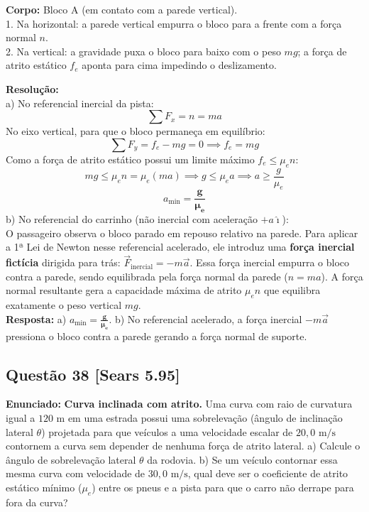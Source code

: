 \documentclass[11pt,a4paper]{article}
\begin{document}
\begin{dclbox}
\textbf{Corpo:} Bloco A (em contato com a parede vertical).\\
1. Na horizontal: a parede vertical empurra o bloco para a frente com a força normal $n$.\\
2. Na vertical: a gravidade puxa o bloco para baixo com o peso $mg$; a força de atrito estático $f_e$ aponta para cima impedindo o deslizamento.
\end{dclbox}

\noindent
\textbf{Resolução:}\\
a) No referencial inercial da pista:
\[ \sum F_x = n = m a \]
No eixo vertical, para que o bloco permaneça em equilíbrio:
\[ \sum F_y = f_e - mg = 0 \implies f_e = mg \]
Como a força de atrito estático possui um limite máximo $f_e \le \mu_e n$:
\[ mg \le \mu_e n = \mu_e (m a) \implies g \le \mu_e a \implies a \ge \frac{g}{\mu_e} \]
\[ a_{\text{min}} = \mathbf{\frac{g}{\mu_e}} \]
b) No referencial do carrinho (não inercial com aceleração $+a\hat{\imath}$):\\
O passageiro observa o bloco parado em repouso relativo na parede. Para aplicar a 1ª Lei de Newton nesse referencial acelerado, ele introduz uma \textbf{força inercial fictícia} dirigida para trás: $\vec{F}_{\text{inercial}} = -m\vec{a}$. Essa força inercial empurra o bloco contra a parede, sendo equilibrada pela força normal da parede ($n = ma$). A força normal resultante gera a capacidade máxima de atrito $\mu_e n$ que equilibra exatamente o peso vertical $mg$.\\
\textbf{Resposta:} a) $a_{\text{min}} = \mathbf{\frac{g}{\mu_e}}$. b) No referencial acelerado, a força inercial $-m\vec{a}$ pressiona o bloco contra a parede gerando a força normal de suporte.

\vspace{0.3cm}
\subsection*{Questão 38 [Sears 5.95]}
\textbf{Enunciado:} \textbf{Curva inclinada com atrito.} Uma curva com raio de curvatura igual a $120\text{ m}$ em uma estrada possui uma sobrelevação (ângulo de inclinação lateral $\theta$) projetada para que veículos a uma velocidade escalar de $20,0\text{ m/s}$ contornem a curva sem depender de nenhuma força de atrito lateral. a) Calcule o ângulo de sobrelevação lateral $\theta$ da rodovia. b) Se um veículo contornar essa mesma curva com velocidade de $30,0\text{ m/s}$, qual deve ser o coeficiente de atrito estático mínimo ($\mu_e$) entre os pneus e a pista para que o carro não derrape para fora da curva?
\end{document}

